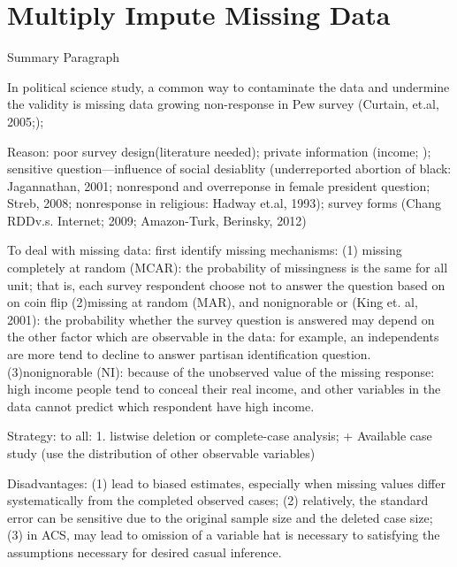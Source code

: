 
\section{Multiply Impute Missing Data}

Summary Paragraph\par

In political science study, a common way to contaminate the data and undermine the validity is missing data growing non-response in Pew survey (Curtain, et.al, 2005;);\par

Reason: poor survey design(literature needed); private information (income;  ); sensitive question—influence of social desiablity (underreported abortion of black: Jagannathan, 2001; nonrespond and overreponse in female president question; Streb, 2008; nonresponse in religious: Hadway et.al, 1993); survey forms (Chang RDDv.s. Internet; 2009; Amazon-Turk, Berinsky, 2012)\par

To deal with missing data: first identify missing mechanisms: (1) missing completely at random (MCAR): the probability of missingness is the same for all unit; that is, each survey respondent choose not to answer the question based on on coin flip (2)missing at random (MAR), and nonignorable or (King et. al, 2001): the probability whether the survey question is answered may depend on the other factor which are observable in the data: for example, an independents are more tend to decline to answer partisan identification question. (3)nonignorable (NI): because of the unobserved value of the missing response: high income people tend to conceal their real income, and other variables in the data cannot predict which respondent have high income.\par

Strategy: to all: 1. listwise deletion or complete-case analysis; +  Available case study  (use the distribution of other observable variables)\par

Disadvantages: (1) lead to biased estimates, especially when missing values differ systematically from the completed observed cases; (2) relatively, the standard error can be sensitive due to the original sample size and the deleted case size; (3) in ACS, may lead to omission of a variable hat is necessary to satisfying the assumptions necessary for desired casual inference.\par

